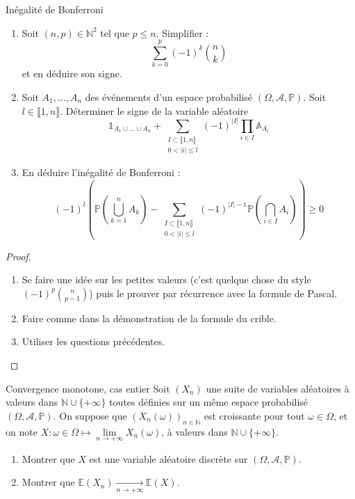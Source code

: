 \documentclass[french,a4paper]{article}
\renewcommand{\P}{\mathbb{P}}
\newcommand{\N}{\mathbb{N}}
\newcommand{\E}{\mathbb{E}}
\theoremstyle{plain}
\theoremstyle{definition}
\theoremstyle{remark}
\begin{document}
\begin{ex}{Inégalité de Bonferroni}
	\begin{enumerate}
		\item Soit $(n,p)\in\N^2$ tel que $p\leqslant n$. Simplifier : $$\sum_{k=0}^{p}(-1)^k\binom{n}{k}$$ et en déduire son signe.
		\item Soit $A_1,\ldots,A_n$ des événements d'un espace probabilisé $(\Omega,\mathcal{A},\P)$. Soit $l\in\llbracket1,n\rrbracket$. Déterminer le signe de la variable aléatoire $$\mathbb{1}_{A_1\cup\ldots\cup A_n}+\sum_{\substack{I\subset\llbracket1,n\rrbracket \\ 0<\lvert i\rvert\leqslant l}}(-1)^{\lvert I\rvert}\prod_{i\in I}\mathbb{A}_{A_i}$$
		\item En déduire l'inégalité de Bonferroni : $$(-1)^l\left(\P\left(\bigcup_{k=1}^nA_k\right)-\sum_{\substack{I\subset\llbracket1,n\rrbracket \\ 0<\lvert i\rvert\leqslant l}}(-1)^{\lvert I\rvert-1}\P\left(\bigcap_{i\in I}A_i\right)\right)\geqslant0$$
	\end{enumerate}
\end{ex}
\begin{proof}
	\begin{enumerate}
		\item Se faire une idée sur les petites valeurs (c'est quelque chose du style $(-1)^p\binom{n}{p-1}$) puis le prouver par récurrence avec la formule de Pascal.
		\item Faire comme dans la démonstration de la formule du crible.
		\item Utiliser les questions précédentes.
	\end{enumerate}
\end{proof}

\begin{ex}{Convergence monotone, cas entier}
	Soit $(X_n)$ une suite de variables aléatoires à valeurs dans $\N\cup\{+\infty\}$ toutes définies sur un même espace probabilisé $(\Omega,\mathcal{A},\P)$. On suppose que $(X_n(\omega))_{n\in\N}$ est croissante pour tout $\omega\in\Omega$, et on note $X:\omega\in\Omega\mapsto\displaystyle\underset{n\to+\infty}{\lim}X_n(\omega)$, à valeurs dans $\N\cup\{+\infty\}$.
	\begin{enumerate}
		\item Montrer que $X$ est une variable aléatoire discrète sur $(\Omega,\mathcal{A},\P)$.
		\item Montrer que $\E(X_n)\displaystyle\xrightarrow[n\to+\infty]{}\E(X)$.
	\end{enumerate}
\end{ex}
\end{document}
